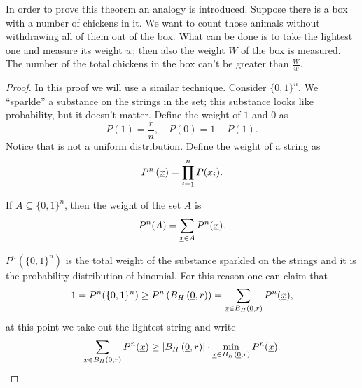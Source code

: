 In order to prove this theorem an analogy is introduced.
Suppose there is a box with a number of chickens in it.
We want to count those animals without withdrawing all of them out of the box. What can be done is to take the lightest one and measure its weight $w$; then also the weight $W$ of the box is measured.
The number of the total chickens in the box can't be greater than $\frac{W}{w}$.

\begin{proof}
	In this proof we will use a similar technique.
	Consider $\{0, 1\}^n$.
	We ``sparkle'' a substance on the strings in the set; this substance looks like probability, but it doesn't matter.
	Define the weight of $1$ and $0$ as 
	\begin{equation*}
		P(1) = \frac{r}{n}, \quad P(0) = 1 - P(1).
	\end{equation*}
	Notice that is not a uniform distribution.
	Define the weight of a string as
	\begin{equation*}
		P^n\left(\underline{x}\right) = \prod_{i = 1}^n P(x_i).
	\end{equation*}

	If $A \subseteq \{0, 1\}^n$, then the weight of the set $A$ is
	\begin{equation*}
		P^n(A) = \sum_{\underline{x} \in A} P^n(\underline{x}).
	\end{equation*}

	$P^n(\{0, 1\}^n)$ is the total weight of the substance sparkled on the strings and it is the probability distribution of binomial.
	For this reason one can claim that
	\begin{equation*}
		1
		=
		P^n (\{0, 1\}^n)
		\ge
		P^n \left(B_H\left(\underline{0}, r\right)\right)
		=
		\sum_{\underline{x} \in B_H\left(\underline{0}, r\right)} P^n(\underline{x}),
	\end{equation*}
	at this point we take out the lightest string and write
	\begin{equation*}
		\sum_{\underline{x} \in B_H\left(\underline{0}, r\right)} P^n(\underline{x})
		\ge
		\left|{B_H\left(\underline{0}, r\right)}\right| \cdot \min_{\underline{x} \in B_H\left(\underline{0}, r\right)} P^n(\underline{x}).
	\end{equation*}


\end{proof}
